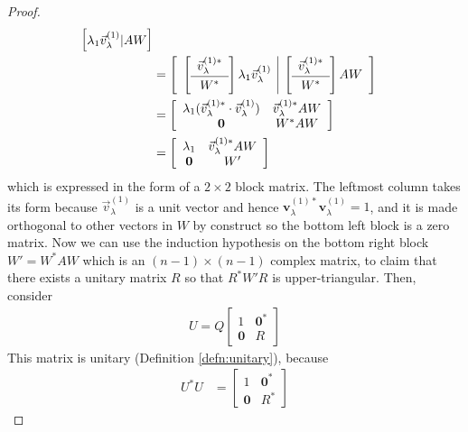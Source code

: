 \begin{proof}
\begin{align}
\begin{bmatrix}
\lambda_1\vec{v}_\lambda^{(1)} | AW
\end{bmatrix} \nonumber \\
&= 
\left[\begin{array}{c|c}
\left[\begin{array}{c}
\vec{v}_\lambda^{(1)*} \Bstrut \\
\hline
W^* \Tstrut
\end{array}\right]\lambda_1\vec{v}_\lambda^{(1)} &
\left[\begin{array}{c}
\vec{v}_\lambda^{(1)*} \Bstrut \\
\hline
W^* \Tstrut
\end{array}\right]AW
\end{array}\right] \nonumber \\
&=
\left[\begin{array}{cc}
\lambda_1 (\vec{v}_\lambda^{(1)*} \cdot \vec{v}_\lambda^{(1)}) & \vec{v}_\lambda^{(1)*}AW \\
\textbf{0} & W^*AW
\end{array}\right] \nonumber \\
&=
\left[\begin{array}{cc}
\lambda_1 & \vec{v}_\lambda^{(1)*}AW \\
\textbf{0} & W'
\end{array}\right] \label{eqn:QAQSchur}
\end{align}
which is expressed in the form of a $2\times 2$ block matrix. The leftmost column takes its form because $\vec{v}_\lambda^{(1)}$ is a unit vector and hence $\textbf{v}_\lambda^{(1)*} \textbf{v}_\lambda^{(1)} = 1$, and it is made orthogonal to other vectors in $W$ by construct so the bottom left block is a zero matrix. Now we can use the induction hypothesis on the bottom right block $W' = W^*AW$ which is an $(n-1) \times (n-1)$ complex matrix, to claim that there exists a unitary matrix $R$ so that $R^*W'R$ is upper-triangular. Then, consider
\begin{align}
U = 
Q 
\left[\begin{array}{cc}
1 & \textbf{0}^* \\
\textbf{0} & R
\end{array}\right]
\end{align}
This matrix is unitary (Definition \ref{defn:unitary}), because
\begin{align*}
U^*U &= 
\left[\begin{array}{cc}
1 & \textbf{0}^* \\
\textbf{0} & R^*
\end{array}\right]

\end{align*}
\end{proof}

